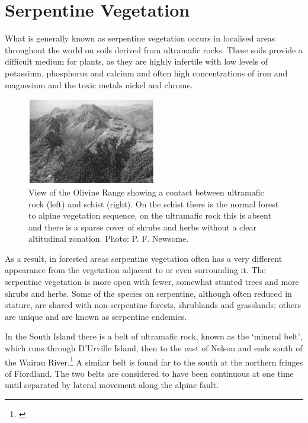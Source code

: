 \section{Serpentine Vegetation}

What is generally known as serpentine vegetation occurs in localised areas throughout the world on soils derived from ultramafic rocks.
These soils provide a difficult medium for plants, as they are highly infertile with low levels of potassium, phosphorus and calcium and often high concentrations of iron and magnesium and the toxic metals nickel and chrome.

\begin{figure}
	\includegraphics[width=0.5\textwidth]{graphics/figure89olivine-range.jpg}
	\centering
	\caption[View of the Olivine Range]{View of the Olivine Range showing a contact between ultramafic rock (left) and schist (right).
    On the schist there is the normal forest to alpine vegetation sequence, on the ultramafic rock this is absent and there is a sparse cover of shrubs and herbs without a clear altitudinal zonation.
	Photo: P. F. Newsome.}
	\label{fig:89olivine-range}
\end{figure}

As a result, in forested areas serpentine vegetation often has a very different appearance from the vegetation adjacent to or even surrounding it.
The serpentine vegetation is more open with fewer, somewhat stunted trees and more shrubs and herbs.
Some of the species on serpentine, although often reduced in stature, are shared with non-serpentine forests, shrublands and grasslands; others are unique and are known as serpentine endemics.

In the South Island there is a belt of ultramafic rock, known as the `mineral belt', which runs through D'Urville Island, then to the east of Nelson and ends south of the Wairau River.\footnote{\cite{betts1918notes}}
A similar belt is found far to the south at the northern fringes of Fiordland.
The two belts are considered to have been continuous at one time until separated by lateral movement along the alpine fault.

